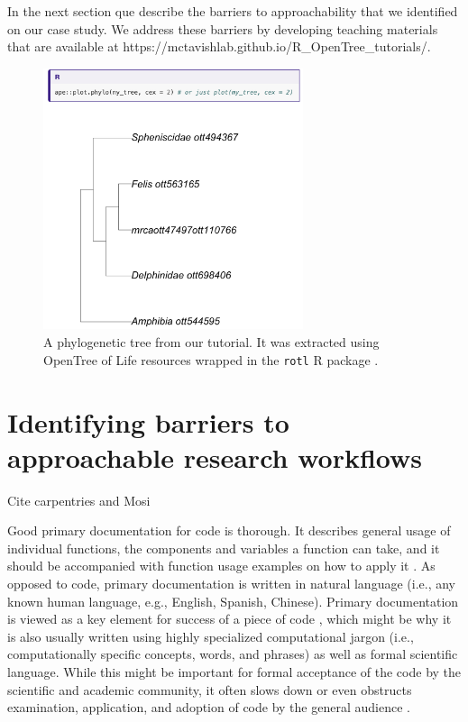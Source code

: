 \documentclass[12pt]{article}
\begin{document}
In the next section que describe the barriers to approachability that we identified
on our case study. We address these barriers by developing teaching materials that are
available at
https://mctavishlab.github.io/R\_OpenTree\_tutorials/.



\begin{figure}
\begin{center}
\includegraphics[width=3in]{fig-tree.png}
\end{center}
\caption{A phylogenetic tree from our tutorial. It was extracted using OpenTree of Life resources \citep{opentreeoflife2019synth} wrapped in the \texttt{rotl} R package \citep{michonneau2016rotl}. \label{fig:tree}}
\end{figure}

\section*{Identifying barriers to approachable research workflows}
\label{sec:identifying}


Cite carpentries and Mosi

Good primary documentation for code is thorough. It describes general usage of individual functions,
the components and variables a function can take, and it should be accompanied with
function usage examples on how to apply it \citep{karimzadeh2018top}.
As opposed to code, primary documentation is written in natural language (i.e.,
any known human language, e.g., English, Spanish, Chinese).
Primary documentation is viewed as a key element for success of a piece of code
\citep{karimzadeh2018top},
which might be why it is also usually written using highly specialized computational jargon (i.e., computationally specific concepts,
words, and phrases) as well as formal scientific language.
While this might be important for formal acceptance of the code by the scientific
and academic community, it often slows down or even
obstructs examination, application, and adoption of code by the general audience \citep{ball2017its}.
\end{document}
